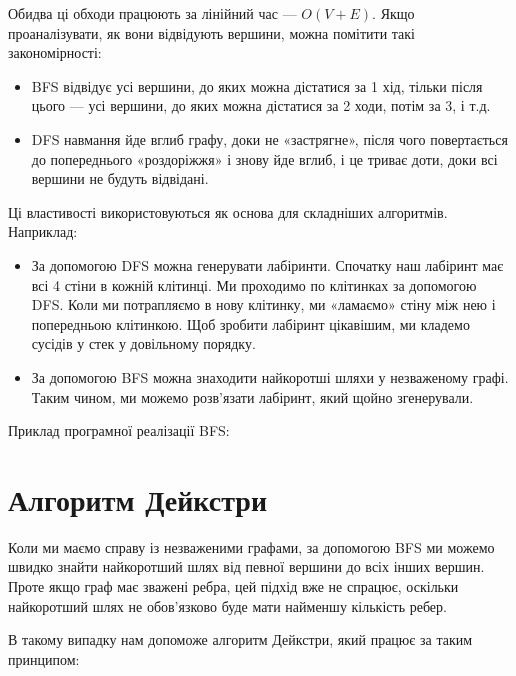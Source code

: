 \documentclass[12pt,a4paper]{report}
\begin{document}
Обидва ці обходи працюють за лінійний час --- \(O(V + E)\). Якщо проаналізувати, як вони відвідують вершини, можна помітити такі закономірності:
\begin{itemize}
    \item BFS відвідує усі вершини, до яких можна дістатися за 1 хід, тільки після цього --- усі вершини, до яких можна дістатися за 2 ходи, потім за 3, і т.д.
    \item DFS навмання йде вглиб графу, доки не «застрягне», після чого повертається до попереднього «роздоріжжя» і знову йде вглиб, і це триває доти, доки всі вершини не будуть відвідані.
\end{itemize}

Ці властивості використовуються як основа для складніших алгоритмів. Наприклад:

\begin{itemize}
    \item За допомогою DFS можна генерувати лабіринти. Спочатку наш лабіринт має всі 4 стіни в кожній клітинці. Ми проходимо по клітинках за допомогою DFS. Коли ми потрапляємо в нову клітинку, ми «ламаємо» стіну між нею і попередньою клітинкою. Щоб зробити лабіринт цікавішим, ми кладемо сусідів у стек у довільному порядку.
    \item За допомогою BFS можна знаходити найкоротші шляхи у незваженому графі. Таким чином, ми можемо розв’язати лабіринт, який щойно згенерували.
\end{itemize}

Приклад програмної реалізації BFS:





\section{Алгоритм Дейкстри}

Коли ми маємо справу із незваженими графами, за допомогою BFS ми можемо швидко знайти найкоротший шлях від певної вершини до всіх інших вершин. Проте якщо граф має зважені ребра, цей підхід вже не спрацює, оскільки найкоротший шлях не обов’язково буде мати найменшу кількість ребер.

В такому випадку нам допоможе алгоритм Дейкстри, який працює за таким принципом:
\end{document}

